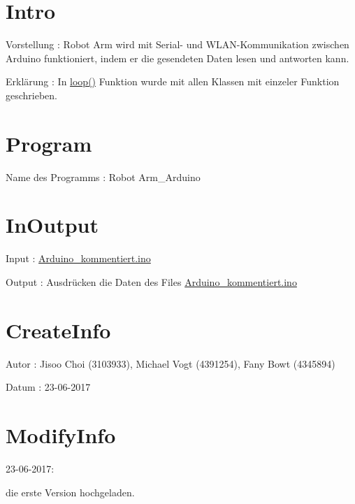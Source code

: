 \hypertarget{index_Intro}{}\section{Intro}\label{index_Intro}

\begin{DoxyItemize}
\item Vorstellung \+: Robot Arm wird mit Serial-\/ und W\+L\+A\+N-\/\+Kommunikation zwischen Arduino funktioniert, indem er die gesendeten Daten lesen und antworten kann.
\item Erklärung \+: In \hyperlink{_arduino__kommentiert_8ino_afe461d27b9c48d5921c00d521181f12f}{loop()} Funktion wurde mit allen Klassen mit einzeler Funktion geschrieben. 
\end{DoxyItemize}\hypertarget{index_Program}{}\section{Program}\label{index_Program}

\begin{DoxyItemize}
\item Name des Programms \+: Robot Arm\+\_\+\+Arduino 
\end{DoxyItemize}\hypertarget{index_InOutput}{}\section{In\+Output}\label{index_InOutput}

\begin{DoxyItemize}
\item Input \+: \hyperlink{_arduino__kommentiert_8ino}{Arduino\+\_\+kommentiert.\+ino}
\item Output \+: Ausdrücken die Daten des Files \hyperlink{_arduino__kommentiert_8ino}{Arduino\+\_\+kommentiert.\+ino} 
\end{DoxyItemize}\hypertarget{index_CreateInfo}{}\section{Create\+Info}\label{index_CreateInfo}

\begin{DoxyItemize}
\item Autor \+: Jisoo Choi (3103933), Michael Vogt (4391254), Fany Bowt (4345894)
\item Datum \+: 23-\/06-\/2017 
\end{DoxyItemize}\hypertarget{index_ModifyInfo}{}\section{Modify\+Info}\label{index_ModifyInfo}

\begin{DoxyItemize}
\item 23-\/06-\/2017\+:
\begin{DoxyEnumerate}
\item die erste Version hochgeladen. 
\end{DoxyEnumerate}
\end{DoxyItemize}